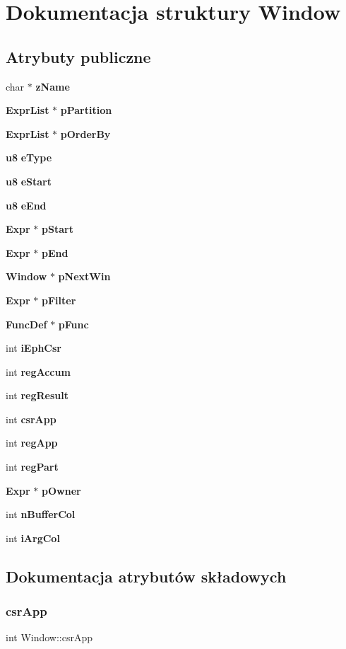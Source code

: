 \section{Dokumentacja struktury Window}
\label{struct_window}
\subsection*{Atrybuty publiczne}
\begin{DoxyCompactItemize}
\item 
char $\ast$ \textbf{ z\+Name}
\item 
\textbf{ Expr\+List} $\ast$ \textbf{ p\+Partition}
\item 
\textbf{ Expr\+List} $\ast$ \textbf{ p\+Order\+By}
\item 
\textbf{ u8} \textbf{ e\+Type}
\item 
\textbf{ u8} \textbf{ e\+Start}
\item 
\textbf{ u8} \textbf{ e\+End}
\item 
\textbf{ Expr} $\ast$ \textbf{ p\+Start}
\item 
\textbf{ Expr} $\ast$ \textbf{ p\+End}
\item 
\textbf{ Window} $\ast$ \textbf{ p\+Next\+Win}
\item 
\textbf{ Expr} $\ast$ \textbf{ p\+Filter}
\item 
\textbf{ Func\+Def} $\ast$ \textbf{ p\+Func}
\item 
int \textbf{ i\+Eph\+Csr}
\item 
int \textbf{ reg\+Accum}
\item 
int \textbf{ reg\+Result}
\item 
int \textbf{ csr\+App}
\item 
int \textbf{ reg\+App}
\item 
int \textbf{ reg\+Part}
\item 
\textbf{ Expr} $\ast$ \textbf{ p\+Owner}
\item 
int \textbf{ n\+Buffer\+Col}
\item 
int \textbf{ i\+Arg\+Col}
\end{DoxyCompactItemize}


\subsection{Dokumentacja atrybutów składowych}
\mbox{\label{struct_window_a1e7ffe69435eb489b3417e00d6ce6631}} 
\subsubsection{csrApp}
{\footnotesize\ttfamily int Window\+::csr\+App}

